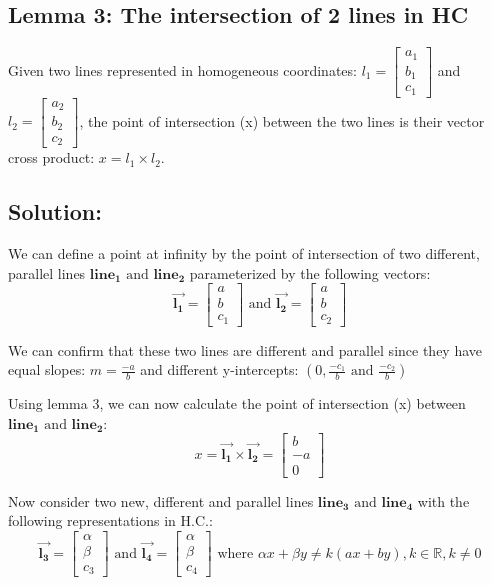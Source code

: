 \documentclass{article}
\begin{document}
\subsection*{Lemma 3: The intersection of 2 lines in HC}
Given two lines represented in homogeneous coordinates: \(l_1 = \begin{bmatrix}
    a_1 \\ b_1 \\ c_1
\end{bmatrix}\) and \(l_2 = \begin{bmatrix}
    a_2 \\ b_2 \\ c_2
\end{bmatrix}\), the point of intersection (x) between the two lines is their vector cross product: \(x = l_1 \times l_2\).

\subsection*{Solution:}
We can define a point at infinity by the point of intersection of two different, parallel lines $\boldsymbol{line_1} \text{ and } \boldsymbol{line_2}$ parameterized by the following vectors:
\[
\boldsymbol{\Vec{l_1}} = \begin{bmatrix}
    a \\ b \\ c_1
\end{bmatrix}
\text{ and } \boldsymbol{\Vec{l_2}} = \begin{bmatrix}
    a \\ b \\ c_2
\end{bmatrix}\]

We can confirm that these two lines are different and parallel since they have equal slopes: $m = \frac{-a}{b}$ and different y-intercepts: $(0, \frac{-c_1}{b} \text{ and } \frac{-c_2}{b})$

Using lemma 3, we can now calculate the point of intersection (x) between $\boldsymbol{line_1} \text{ and } \boldsymbol{line_2}$:
\[
x = \boldsymbol{\Vec{l_1}} \times \boldsymbol{\Vec{l_2}} = \begin{bmatrix}
    b \\ -a \\ 0
\end{bmatrix}
\]

Now consider two new, different and parallel lines $\boldsymbol{line_3} \text{ and } \boldsymbol{line_4}$ with the following representations in H.C.:
\[
\boldsymbol{\Vec{l_3}} = \begin{bmatrix}
    \alpha \\ \beta \\ c_3
\end{bmatrix}
\text{ and } \boldsymbol{\Vec{l_4}} = \begin{bmatrix}
    \alpha \\ \beta \\ c_4
\end{bmatrix} \text{ where } \alpha x + \beta y \neq k (ax + by), k\in\mathbb{R}, k\neq 0\]
\end{document}
